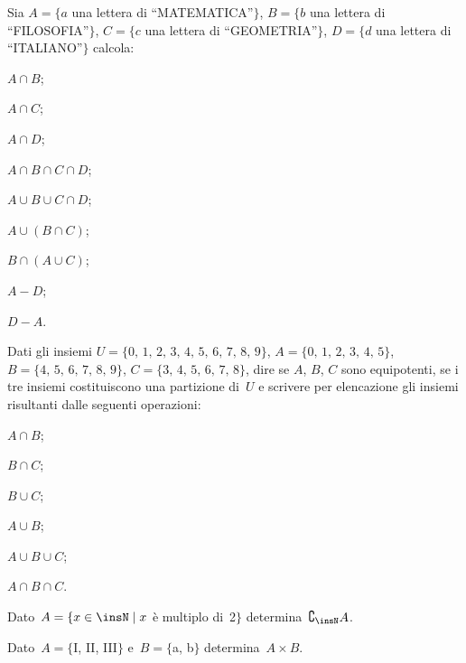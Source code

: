 \begin{esercizio}
\label{ese:\thechapter.107}
Sia $A=\{a$ una lettera di ``MATEMATICA''$\}$, $B=\{b$ una lettera di ``FILOSOFIA''$\}$, $C=\{c$ una lettera di ``GEOMETRIA''$\}$, $D=\{d$ una lettera di ``ITALIANO''$\}$ calcola:
\begin{multicols}{3}
\begin{enumeratea}
 \item $A\cap B$;
 \item $A\cap C$;
 \item $A\cap D$;
 \item $A\cap B \cap C \cap D$;
 \item $A\cup B \cup C \cap D$;
 \item $A\cup (B\cap C)$;
 \item $B\cap (A\cup C)$;
 \item $A-D$;
 \item $D-A$.
\end{enumeratea}
\end{multicols}
\end{esercizio}

\begin{esercizio}
\label{ese:\thechapter.108}
Dati gli insiemi $U=\{\text{0, 1, 2, 3, 4, 5, 6, 7, 8, 9} \}$, $A=\{\text{0, 1, 2, 3, 4, 5}\}$, $B=\{\text{4, 5, 6, 7, 8, 9}\}$, $C=\{\text{3, 4, 5, 6, 7, 8}\}$, dire se $A$, $B$, $C$ sono equipotenti, se i tre insiemi costituiscono una partizione di~$U$ e scrivere per elencazione gli insiemi risultanti dalle seguenti operazioni:
\begin{multicols}{3}
\begin{enumeratea}
 \item $A\cap B$;
 \item $B\cap C$;
 \item $B\cup C$;
 \item $A\cup B$;
 \item $A\cup B \cup C$;
 \item $A\cap B\cap C$.
\end{enumeratea}
\end{multicols}
\end{esercizio}

\begin{esercizio}
\label{ese:\thechapter.109}
Dato~$A=\{x\in\insN\mid x$ è multiplo di~2$\}$ determina~$\complement_{\insN}A$.
\end{esercizio}

\begin{esercizio}
\label{ese:\thechapter.110}
Dato~$A=\{$I, II, III$\}$ e~$B=\{$a, b$\}$ determina~$A\times B$.
\end{esercizio}

